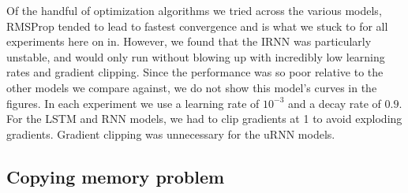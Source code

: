 \documentclass{article} %
\begin{document}
Of the handful of optimization algorithms we tried across the various models, 
RMSProp \citep{RMSPROP} tended to lead to fastest convergence and is what we stuck to for all
experiments here on in. However, we found that the IRNN was particularly unstable, and would only run without 
blowing up with incredibly low learning rates and gradient clipping. Since the performance was so poor
relative to the other models we compare against, we do not show this model's curves in the figures.  
In each experiment we use a learning rate of $10^{-3}$
and a decay rate of $0.9$. For the LSTM and RNN models, we had to clip gradients at 1 to avoid exploding 
gradients. Gradient clipping was unnecessary for the uRNN models.


\subsection{Copying memory problem}
\end{document}

